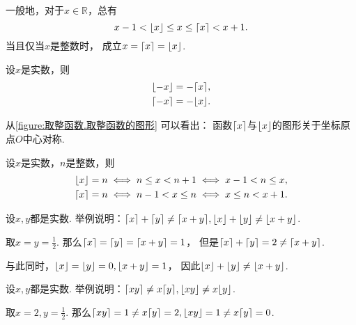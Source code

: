 \begin{property}\label{theorem:取整函数.性质1}
一般地，对于\(x\in\mathbb{R}\)，总有\begin{equation}
	x - 1 < \lfloor x\rfloor \leq x \leq \lceil x\rceil < x + 1.
\end{equation}
当且仅当\(x\)是整数时，
成立\(x = \lceil x\rceil = \lfloor x\rfloor\).
\end{property}

\begin{property}
设\(x\)是实数，则\begin{gather}
	\lfloor-x\rfloor = -\lceil x\rceil,
	\label{equation:取整函数.取整函数的对称性1} \\
	\lceil-x\rceil = -\lfloor x\rfloor.
	\label{equation:取整函数.取整函数的对称性2}
\end{gather}
\end{property}
\begin{remark}
从\cref{figure:取整函数.取整函数的图形} 可以看出：
函数\(\lceil x\rceil\)与\(\lfloor x\rfloor\)的图形关于坐标原点\(O\)中心对称.
\end{remark}

\begin{property}
设\(x\)是实数，\(n\)是整数，则\begin{gather}
	\lfloor x\rfloor = n
	\iff
	n \leq x < n+1
	\iff
	x-1 < n \leq x,
	\label{equation:取整函数.序关系1} \\
	\lceil x\rceil = n
	\iff
	n-1 < x \leq n
	\iff
	x \leq n < x+1.
	\label{equation:取整函数.序关系2}
\end{gather}
\end{property}

\begin{example}
设\(x,y\)都是实数.
举例说明：\(\lceil x\rceil + \lceil y\rceil \neq \lceil x+y\rceil,
\lfloor x\rfloor + \lfloor y\rfloor \neq \lfloor x+y\rfloor\).
\begin{solution}
取\(x = y = \frac12\).
那么\(\lceil x\rceil = \lceil y\rceil = \lceil x+y\rceil = 1\)，
但是\(\lceil x\rceil + \lceil y\rceil = 2 \neq \lceil x+y\rceil\).

与此同时，\(\lfloor x\rfloor = \lfloor y\rfloor = 0,
\lfloor x+y\rfloor = 1\)，
因此\(\lfloor x\rfloor + \lfloor y\rfloor \neq \lfloor x+y\rfloor\).
\end{solution}
\end{example}
\begin{example}
设\(x,y\)都是实数.
举例说明：\(\lceil xy\rceil \neq x\lceil y\rceil,
\lfloor xy\rfloor \neq x\lfloor y\rfloor\).
\begin{solution}
取\(x=2,y=\frac12\).
那么\(\lceil xy\rceil = 1 \neq x\lceil y\rceil = 2,
\lfloor xy\rfloor = 1 \neq x\lceil y\rceil = 0\).
\end{solution}
\end{example}

